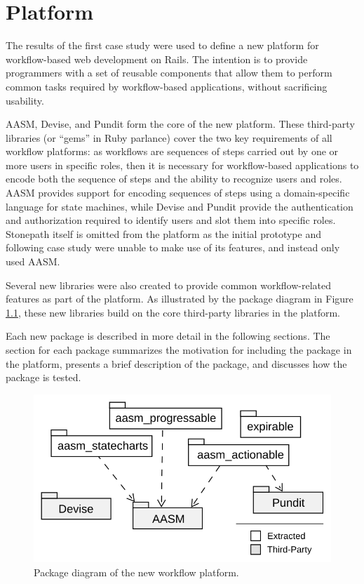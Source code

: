 \documentclass[document.tex]{subfiles}
\begin{document}
\chapter{Platform}
\label {ch:platform}

The results of the first case study were used to define a new platform for workflow-based web development on Rails. The intention is to provide programmers with a set of reusable components that allow them to perform common tasks required by workflow-based applications, without sacrificing usability.

AASM, Devise, and Pundit form the core of the new platform. These third-party libraries (or ``gems'' in Ruby parlance) cover the two key requirements of all workflow platforms: as workflows are sequences of steps carried out by one or more users in specific roles, then it is necessary for workflow-based applications to encode both the sequence of steps and the ability to recognize users and roles. AASM provides support for encoding sequences of steps using a domain-specific language for state machines, while Devise and Pundit provide the authentication and authorization required to identify users and slot them into specific roles. Stonepath itself is omitted from the platform as the initial prototype and following case study were unable to make use of its features, and instead only used AASM.

Several new libraries were also created to provide common workflow-related features as part of the platform. As illustrated by the package diagram in Figure \ref{fig:platform-package-diagram}, these new libraries build on the core third-party libraries in the platform.

Each new package is described in more detail in the following sections. The section for each package summarizes the motivation for including the package in the platform, presents a brief description of the package, and discusses how the package is tested.

\begin{figure}[!ht]
\centering \includegraphics[width=4.5in]{./img/platform/platform-package-diagram}
\caption{Package diagram of the new workflow platform.}
\label{fig:platform-package-diagram}
\end{figure}
\end{document}
